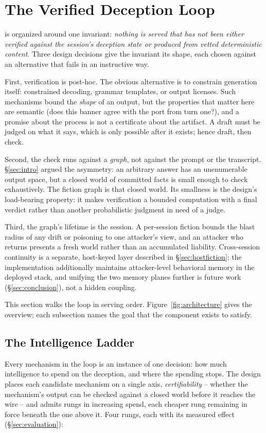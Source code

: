 \section{The Verified Deception Loop}
\label{sec:design}

\RAGIN is organized around one invariant: \emph{nothing is served that has
not been either verified against the session's deception state or produced
from vetted deterministic content}. Three design decisions give the
invariant its shape, each chosen against an alternative that fails in an
instructive way.

First, verification is post-hoc. The obvious alternative is to constrain
generation itself: constrained decoding, grammar templates, or output
licenses. Such mechanisms bound the \emph{shape} of an output, but the
properties that matter here are semantic (does this banner agree with the
port from turn one?), and a promise about the process is not a
certificate about the artifact. A draft must be judged on what it says,
which is only possible after it exists; hence draft, then check.

Second, the check runs against a \emph{graph}, not against the prompt or
the transcript. \S\ref{sec:intro} argued the asymmetry: an arbitrary
answer has an unenumerable output space, but a closed world of committed
facts is small enough to check exhaustively. The fiction graph is that
closed world. Its smallness is the design's load-bearing property: it
makes verification a bounded computation with a final verdict rather
than another probabilistic judgment in need of a judge.

Third, the graph's lifetime is the session. A per-session fiction bounds
the blast radius of any drift or poisoning to one attacker's view, and an
attacker who returns presents a fresh world rather than an accumulated
liability. Cross-session continuity is a separate, host-keyed layer
described in \S\ref{sec:hostfiction}: the implementation additionally
maintains attacker-level behavioral memory in the deployed stack, and
unifying the two memory planes further
is future work (\S\ref{sec:conclusion}), not a hidden coupling.

This section walks the loop in serving
order. Figure~\ref{fig:architecture} gives the overview; each subsection
names the goal that the component exists to satisfy.

\subsection{The Intelligence Ladder}
\label{sec:ladder}
Every mechanism in the loop is an instance of one decision: how much
intelligence to spend on the deception, and where the spending stops.
The design places each candidate mechanism on a single axis,
\emph{certifiability} -- whether the mechanism's output can be checked
against a closed world before it reaches the wire -- and admits rungs in
increasing spend, each cheaper rung remaining in force beneath the one
above it. Four rungs, each with its measured effect
(\S\ref{sec:evaluation}):

